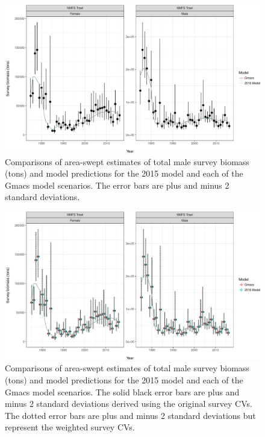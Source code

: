 \documentclass[]{article}
\begin{document}
\begin{figure}[htbp]
\centering
\includegraphics{bbrkc_files/figure-latex/trawl_survey_biomass-1.pdf}
\caption{Comparisons of area-swept estimates of total male survey
biomass (tons) and model predictions for the 2015 model and each of the
Gmacs model scenarios. The error bars are plus and minus 2 standard
deviations.\label{fig:trawl_survey_biomass}}
\end{figure}

\begin{figure}[htbp]
\centering
\includegraphics{bbrkc_files/figure-latex/trawl_survey_biomass_weights-1.pdf}
\caption{Comparisons of area-swept estimates of total male survey
biomass (tons) and model predictions for the 2015 model and each of the
Gmacs model scenarios. The solid black error bars are plus and minus 2
standard deviations derived using the original survey CVs. The dotted
error bars are plus and minus 2 standard deviations but represent the
weighted survey CVs.\label{fig:trawl_survey_biomass_weights}}
\end{figure}
\end{document}
